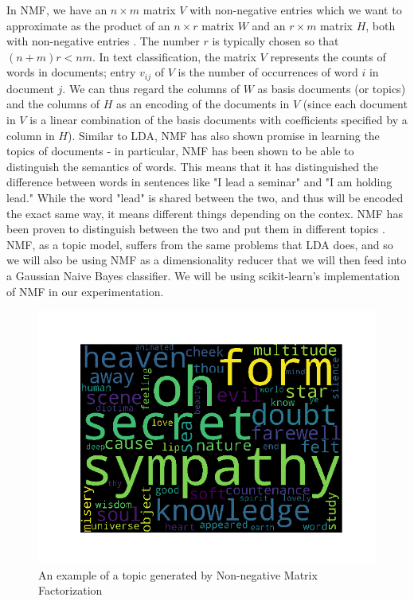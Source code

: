 \documentclass{article}
\begin{document}
In NMF, we have an $n \times m$ matrix $V$ with non-negative entries which we want 
to approximate as the product of an $n \times r$ matrix $W$ and an $r \times m$ matrix
$H$, both with non-negative entries \cite{nnmf}. The number $r$ is typically chosen so that
$(n + m)r < nm$.  In text classification, the matrix 
$V$ represents
the counts of words in documents; entry $v_{ij}$ of $V$ is the number of occurrences of
word $i$ in document $j$. We can thus regard the columns of $W$ as basis documents (or
topics) and 
the columns of $H$ as an encoding of the documents in $V$ (since each document in $V$
is a linear combination of the basis documents with coefficients specified by a column
in $H$). Similar to LDA, NMF has also shown promise in learning the topics of documents - in particular, NMF has been shown to be able to distinguish the semantics of words. This means that it has distinguished the difference between words in sentences like "I lead a seminar" and "I am holding lead." While the word "lead" is shared between the two, and thus will be encoded the exact same way, it means different things depending on the contex. NMF has been proven to distinguish between the two and put them in different topics \cite{nnmf}.  NMF, as a topic model, suffers from the same problems that LDA does, and so we will also be using NMF as a dimensionality reducer that we will then feed into a Gaussian Naive Bayes classifier. We will be using scikit-learn's implementation of NMF in our experimentation. 
\begin{figure}
    \centering
    \includegraphics[scale = .5]{nmf_topic.png}
    \caption{An example of a topic generated by Non-negative Matrix Factorization}
    \label{fig:NMF_topic}
\end{figure}
\end{document}
